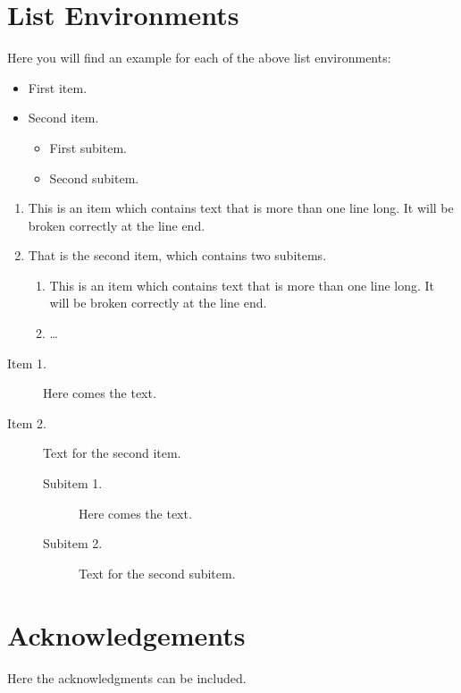 \documentclass{article}
\begin{document}
\newpage


\section{List Environments}
\label{section:lists}

Here you will find an example for each of the above list environments:

\begin{itemize}
\item First item.
\item Second item.
  \begin{itemize}
  \item First subitem.
  \item Second subitem.
  \end{itemize}
\end{itemize}


\begin{enumerate}
\item This is an item which contains text that is more than one line
  long. It will be broken correctly at the line end.
\item That is the second item, which contains two subitems.
  \begin{enumerate}
  \item This is an item which contains text that is more than one line
    long. It will be broken correctly at the line end.
  \item \dots
  \end{enumerate}
\end{enumerate}


\begin{description}
\item[Item 1.]Here comes the text.
\item[Item 2.]Text for the second item.
  \begin{description}
  \item[Subitem 1.]Here comes the text.
  \item[Subitem 2.]Text for the second subitem.
  \end{description}
\end{description}


\newpage


\section{Acknowledgements}
\label{sec:acknowledgements}

Here the acknowledgments can be included.

\newpage





\end{document}
